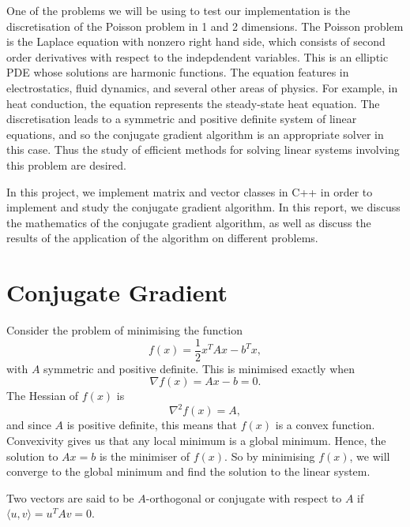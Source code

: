 One of the problems we will be using to test our implementation is the discretisation of the Poisson problem in 1 and 2 dimensions.
The Poisson problem is the Laplace equation with nonzero right hand side, which consists of second order derivatives with respect to the indepdendent variables.
This is an elliptic PDE whose solutions are harmonic functions. 
The equation features in electrostatics, fluid dynamics, and several other areas of physics.
For example, in heat conduction, the equation represents the steady-state heat equation.
The discretisation leads to a symmetric and positive definite system of linear equations, and so the conjugate gradient algorithm is an appropriate solver in this case.
Thus the study of efficient methods for solving linear systems involving this problem are desired.

In this project, we implement matrix and vector classes in C++ in order to implement and study the conjugate gradient algorithm.
In this report, we discuss the mathematics of the conjugate gradient algorithm, as well as discuss the results of the application of the algorithm on different problems.


\section{Conjugate Gradient}
\label{sec:cg}

\iffalse
CG discussion:

Main algorithm
Mathematics of the mechanism
Preconditioning
Limitations of the algorithm
How do we get good/bad convergence?
Proof of convergence
Proof of complexity
\fi


Consider the problem of minimising the function
\[
    f(x) = \frac{1}{2} x^T A x - b^T x,
\]
with $A$ symmetric and positive definite. This is minimised exactly when 
\[
    \nabla f(x) = A x - b = 0.
\]
The Hessian of $f(x)$ is
\[
    \nabla^2 f(x) = A,
\]
and since $A$ is positive definite, this means that $f(x)$ is a convex function.
Convexivity gives us that any local minimum is a global minimum.
Hence, the solution to $Ax=b$ is the minimiser of $f(x)$.
So by minimising $f(x)$, we will converge to the global minimum and find the solution to the linear system.

Two vectors are said to be $A$-orthogonal or conjugate with respect to $A$ if $\langle u,v \rangle = u^T A v= 0$.

